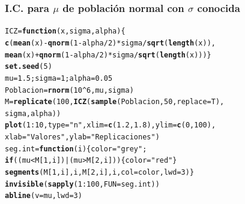 \documentclass[12pt,t]{beamer}\usepackage[]{graphicx}\usepackage[]{color}
\makeatletter
\newcommand{\hlnum}[1]{\textcolor[rgb]{0.686,0.059,0.569}{#1}}%
\newcommand{\hlstr}[1]{\textcolor[rgb]{0.192,0.494,0.8}{#1}}%
\newcommand{\hlopt}[1]{\textcolor[rgb]{0,0,0}{#1}}%
\newcommand{\hlstd}[1]{\textcolor[rgb]{0.345,0.345,0.345}{#1}}%
\newcommand{\hlkwa}[1]{\textcolor[rgb]{0.161,0.373,0.58}{\textbf{#1}}}%
\newcommand{\hlkwb}[1]{\textcolor[rgb]{0.69,0.353,0.396}{#1}}%
\newcommand{\hlkwc}[1]{\textcolor[rgb]{0.333,0.667,0.333}{#1}}%
\newcommand{\hlkwd}[1]{\textcolor[rgb]{0.737,0.353,0.396}{\textbf{#1}}}%
\newenvironment{kframe}{%
 \def\at@end@of@kframe{}%
 \ifinner\ifhmode%
  \def\at@end@of@kframe{\end{minipage}}%
  \begin{minipage}{\columnwidth}%
 \fi\fi%
 \def\FrameCommand##1{\hskip\@totalleftmargin \hskip-\fboxsep
 \colorbox{shadecolor}{##1}\hskip-\fboxsep
     \hskip-\linewidth \hskip-\@totalleftmargin \hskip\columnwidth}%
 \MakeFramed {\advance\hsize-\width
   \@totalleftmargin\z@ \linewidth\hsize
   \@setminipage}}%
 {\par\unskip\endMakeFramed%
 \at@end@of@kframe}
\newenvironment{knitrout}{}{} %
\theoremstyle{plain}
\theoremstyle{definition}
\makeatother
\begin{document}
\begin{frame}[fragile]
\frametitle{I.C. para $\mu$ de población normal con $\sigma$ conocida}
\vspace*{-4ex}

\begin{knitrout}\footnotesize
{}\color{fgcolor}\begin{kframe}
\begin{alltt}
\hlstd{ICZ}\hlkwb{=}\hlkwa{function}\hlstd{(}\hlkwc{x}\hlstd{,}\hlkwc{sigma}\hlstd{,}\hlkwc{alpha}\hlstd{)\{}
  \hlkwd{c}\hlstd{(}\hlkwd{mean}\hlstd{(x)}\hlopt{-}\hlkwd{qnorm}\hlstd{(}\hlnum{1}\hlopt{-}\hlstd{alpha}\hlopt{/}\hlnum{2}\hlstd{)}\hlopt{*}\hlstd{sigma}\hlopt{/}\hlkwd{sqrt}\hlstd{(}\hlkwd{length}\hlstd{(x)),}
  \hlkwd{mean}\hlstd{(x)}\hlopt{+}\hlkwd{qnorm}\hlstd{(}\hlnum{1}\hlopt{-}\hlstd{alpha}\hlopt{/}\hlnum{2}\hlstd{)}\hlopt{*}\hlstd{sigma}\hlopt{/}\hlkwd{sqrt}\hlstd{(}\hlkwd{length}\hlstd{(x)))\}}
\hlkwd{set.seed}\hlstd{(}\hlnum{5}\hlstd{)}
\hlstd{mu}\hlkwb{=}\hlnum{1.5}\hlstd{; sigma}\hlkwb{=}\hlnum{1}\hlstd{; alpha}\hlkwb{=}\hlnum{0.05}
\hlstd{Poblacion}\hlkwb{=}\hlkwd{rnorm}\hlstd{(}\hlnum{10}\hlopt{^}\hlnum{6}\hlstd{,mu,sigma)}
\hlstd{M}\hlkwb{=}\hlkwd{replicate}\hlstd{(}\hlnum{100}\hlstd{,}\hlkwd{ICZ}\hlstd{(}\hlkwd{sample}\hlstd{(Poblacion,}\hlnum{50}\hlstd{,}\hlkwc{replace}\hlstd{=T),}
 \hlstd{sigma,alpha))}
\hlkwd{plot}\hlstd{(}\hlnum{1}\hlopt{:}\hlnum{10}\hlstd{,}\hlkwc{type}\hlstd{=}\hlstr{"n"}\hlstd{,}\hlkwc{xlim}\hlstd{=}\hlkwd{c}\hlstd{(}\hlnum{1.2}\hlstd{,}\hlnum{1.8}\hlstd{),}\hlkwc{ylim}\hlstd{=}\hlkwd{c}\hlstd{(}\hlnum{0}\hlstd{,}\hlnum{100}\hlstd{),}
\hlkwc{xlab}\hlstd{=}\hlstr{"Valores"}\hlstd{,}\hlkwc{ylab}\hlstd{=}\hlstr{"Replicaciones"}\hlstd{)}
\hlstd{seg.int}\hlkwb{=}\hlkwa{function}\hlstd{(}\hlkwc{i}\hlstd{)\{color}\hlkwb{=}\hlstr{"grey"}\hlstd{;}
  \hlkwa{if}\hlstd{((mu}\hlopt{<}\hlstd{M[}\hlnum{1}\hlstd{,i])} \hlopt{|} \hlstd{(mu}\hlopt{>}\hlstd{M[}\hlnum{2}\hlstd{,i]))\{color} \hlkwb{=} \hlstr{"red"}\hlstd{\}}
  \hlkwd{segments}\hlstd{(M[}\hlnum{1}\hlstd{,i],i,M[}\hlnum{2}\hlstd{,i],i,}\hlkwc{col}\hlstd{=color,}\hlkwc{lwd}\hlstd{=}\hlnum{3}\hlstd{)\}}
\hlkwd{invisible}\hlstd{(}\hlkwd{sapply}\hlstd{(}\hlnum{1}\hlopt{:}\hlnum{100}\hlstd{,}\hlkwc{FUN}\hlstd{=seg.int))}
\hlkwd{abline}\hlstd{(}\hlkwc{v}\hlstd{=mu,}\hlkwc{lwd}\hlstd{=}\hlnum{3}\hlstd{)}
\end{alltt}
\end{kframe}
\end{knitrout}

\end{frame}
\end{document}
